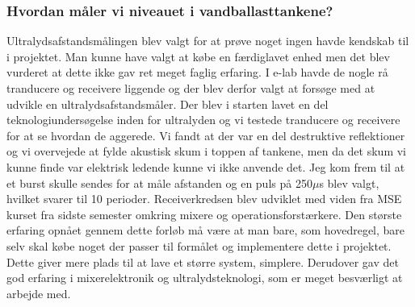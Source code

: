 \subsubsection{Hvordan måler vi niveauet i vandballasttankene?}
Ultralydsafstandsmålingen blev valgt for at prøve noget ingen havde kendskab til i projektet. Man kunne have valgt at købe en færdiglavet enhed men det blev vurderet at dette ikke gav ret meget faglig erfaring. I e-lab havde de nogle rå tranducere og receivere liggende og der blev derfor valgt at forsøge med at udvikle en ultralydsafstandsmåler. Der blev i starten lavet en del teknologiundersøgelse inden for ultralyden og vi testede tranducere og receivere for at se hvordan de aggerede. Vi fandt at der var en del destruktive reflektioner og vi overvejede at fylde akustisk skum i toppen af tankene, men da det skum vi kunne finde var elektrisk ledende kunne vi ikke anvende det. Jeg kom frem til at et burst skulle sendes for at måle afstanden og en puls på 250$\mu$s blev valgt, hvilket svarer til 10 perioder. Receiverkredsen blev udviklet med viden fra MSE kurset fra sidste semester omkring mixere og operationsforstærkere. Den største erfaring opnået gennem dette forløb må være at man bare, som hovedregel, bare selv skal købe noget der passer til formålet og implementere dette i projektet. Dette giver mere plads til at lave et større system, simplere. Derudover gav det god erfaring i mixerelektronik og ultralydsteknologi, som er meget besværligt at arbejde med.


